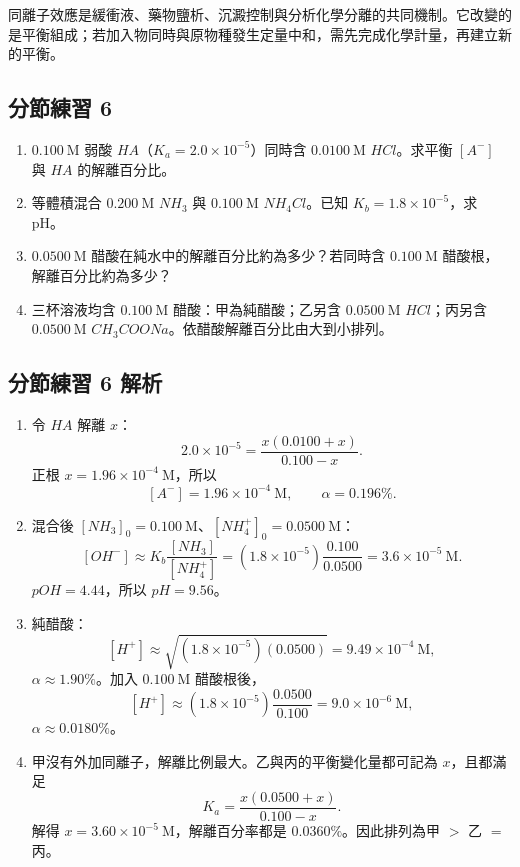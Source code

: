 \documentclass[11pt,a4paper]{article}
\providecommand{\tightlist}{%
  \setlength{\itemsep}{0pt}\setlength{\parskip}{0pt}}
\begin{document}
同離子效應是緩衝液、藥物鹽析、沉澱控制與分析化學分離的共同機制。它改變的是平衡組成；若加入物同時與原物種發生定量中和，需先完成化學計量，再建立新的平衡。

\subsection{分節練習 6}\label{ux5206ux7bc0ux7df4ux7fd2-6}

\begin{enumerate}
\def\labelenumi{\arabic{enumi}.}
\tightlist
\item
  \(0.100\ \mathrm M\) 弱酸 \(HA\)（\(K_a=2.0\times10^{-5}\)）同時含 \(0.0100\ \mathrm M\) \(HCl\)。求平衡 \([A^-]\) 與 \(HA\) 的解離百分比。
\item
  等體積混合 \(0.200\ \mathrm M\) \(NH_3\) 與 \(0.100\ \mathrm M\) \(NH_4Cl\)。已知 \(K_b=1.8\times10^{-5}\)，求 pH。
\item
  \(0.0500\ \mathrm M\) 醋酸在純水中的解離百分比約為多少？若同時含 \(0.100\ \mathrm M\) 醋酸根，解離百分比約為多少？
\item
  三杯溶液均含 \(0.100\ \mathrm M\) 醋酸：甲為純醋酸；乙另含 \(0.0500\ \mathrm M\) \(HCl\)；丙另含 \(0.0500\ \mathrm M\) \(CH_3COONa\)。依醋酸解離百分比由大到小排列。
\end{enumerate}

\subsection{分節練習 6 解析}\label{ux5206ux7bc0ux7df4ux7fd2-6-ux89e3ux6790}

\begin{enumerate}
\def\labelenumi{\arabic{enumi}.}
\tightlist
\item
  令 \(HA\) 解離 \(x\)：
  \[
  2.0\times10^{-5}
  =\frac{x(0.0100+x)}{0.100-x}.
  \]
  正根 \(x=1.96\times10^{-4}\ \mathrm M\)，所以
  \[
  [A^-]=1.96\times10^{-4}\ \mathrm M,
  \qquad
  \alpha=0.196\%.
  \]
\item
  混合後 \([NH_3]_0=0.100\ \mathrm M\)、\([NH_4^+]_0=0.0500\ \mathrm M\)：
  \[
  [OH^-]\approx K_b\frac{[NH_3]}{[NH_4^+]}
  =(1.8\times10^{-5})\frac{0.100}{0.0500}
  =3.6\times10^{-5}\ \mathrm M.
  \]
  \(pOH=4.44\)，所以 \(pH=9.56\)。
\item
  純醋酸：
  \[
  [H^+]\approx\sqrt{(1.8\times10^{-5})(0.0500)}
  =9.49\times10^{-4}\ \mathrm M,
  \]
  \(\alpha\approx1.90\%\)。加入 \(0.100\ \mathrm M\) 醋酸根後，
  \[
  [H^+]\approx(1.8\times10^{-5})\frac{0.0500}{0.100}
  =9.0\times10^{-6}\ \mathrm M,
  \]
  \(\alpha\approx0.0180\%\)。
\item
  甲沒有外加同離子，解離比例最大。乙與丙的平衡變化量都可記為 \(x\)，且都滿足
  \[
  K_a=\frac{x(0.0500+x)}{0.100-x}.
  \]
  解得 \(x=3.60\times10^{-5}\ \mathrm M\)，解離百分率都是 \(0.0360\%\)。因此排列為甲 \(>\) 乙 \(=\) 丙。
\end{enumerate}
\end{document}
